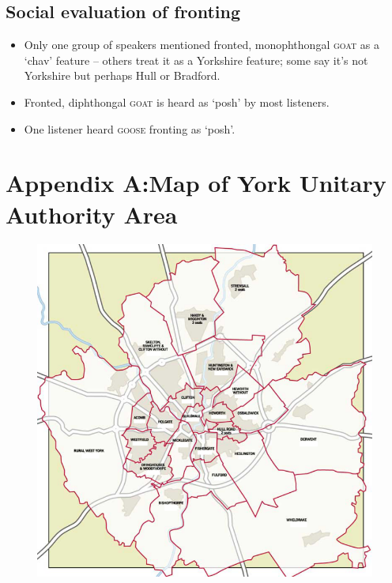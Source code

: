 \documentclass{article}
\begin{document}
\subsection*{Social evaluation of fronting}
\begin{itemize}
\item{Only one group of speakers mentioned fronted, monophthongal \textsc{goat} as a `chav' feature -- others treat it as a Yorkshire feature; some say it's not Yorkshire but perhaps Hull or Bradford.}
\item{Fronted, diphthongal \textsc{goat} is heard as `posh' by most listeners.}
\item{One listener heard \textsc{goose} fronting as `posh'.}
\end{itemize}
\newpage
\nocite{*}


\newpage
\section*{Appendix A:Map of York Unitary Authority Area}
\begin{figure}[!ht]
\hspace{-2cm}
\includegraphics[scale=0.75]{yorkmap.jpg}
\end{figure}
\newpage
\end{document}
